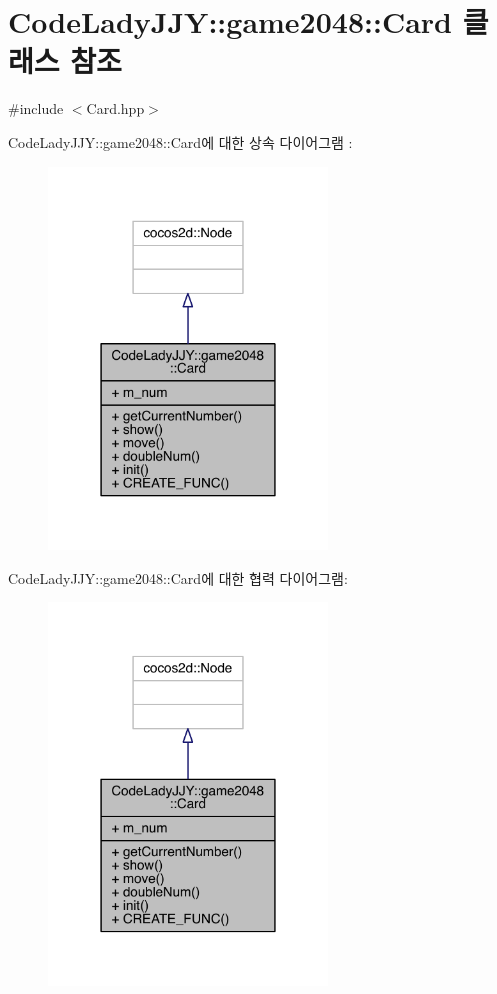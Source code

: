 \hypertarget{class_code_lady_j_j_y_1_1game2048_1_1_card}{}\section{Code\+Lady\+J\+JY\+:\+:game2048\+:\+:Card 클래스 참조}
\label{class_code_lady_j_j_y_1_1game2048_1_1_card}


{\ttfamily \#include $<$Card.\+hpp$>$}



Code\+Lady\+J\+JY\+:\+:game2048\+:\+:Card에 대한 상속 다이어그램 \+: 
\nopagebreak
\begin{figure}[H]
\begin{center}
\leavevmode
\includegraphics[width=210pt]{class_code_lady_j_j_y_1_1game2048_1_1_card__inherit__graph}
\end{center}
\end{figure}


Code\+Lady\+J\+JY\+:\+:game2048\+:\+:Card에 대한 협력 다이어그램\+:
\nopagebreak
\begin{figure}[H]
\begin{center}
\leavevmode
\includegraphics[width=210pt]{class_code_lady_j_j_y_1_1game2048_1_1_card__coll__graph}
\end{center}
\end{figure}
